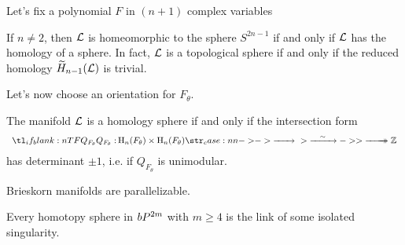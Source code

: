Let's fix a polynomial $F$ in $(n+1)$ complex variables

\begin{proposition}
	If $n\neq 2$, then $\mathcal{L}$ is homeomorphic to the sphere $S^{2n-1}$ if and only if $\mathcal{L}$ has the homology of a sphere. In fact, $\mathcal{L}$ is a topological sphere if and only if the reduced homology $\widetilde{H}_{n-1}(\mathcal{L})$ is trivial.
\end{proposition}

Let's now choose an orientation for $F_\theta$.

\begin{proposition}
	The manifold $\mathcal{L}$ is a homology sphere if and only if the intersection form
	\[
		\lkxfunc{Q_{F_\theta}}{\H_n(F_\theta)\times \H_n(F_\theta)}{\Z}
	\]
	has determinant $\pm 1$, i.e. if $Q_{F_\theta}$ is unimodular.
\end{proposition}

\begin{theorem} 
	Brieskorn manifolds are parallelizable.
\end{theorem}

\begin{theorem}[Brieskorn]
	Every homotopy sphere in $bP^{2m}$ with $m\geq 4$ is the link of some isolated singularity.
\end{theorem}

